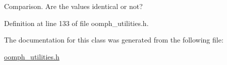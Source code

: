 Comparison. Are the values identical or not? 



Definition at line 133 of file oomph\+\_\+utilities.\+h.



The documentation for this class was generated from the following file\+:\begin{DoxyCompactItemize}
\item 
\hyperlink{oomph__utilities_8h}{oomph\+\_\+utilities.\+h}\end{DoxyCompactItemize}
